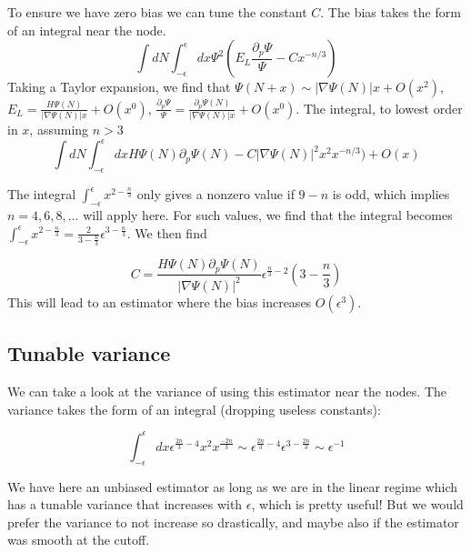 \documentclass{article}
\begin{document}
To ensure we have zero bias we can tune the constant $C$. The bias takes the form of an integral near the node.
$$\int dN \int_{-\epsilon}^{\epsilon} dx \Psi^2 (E_L \frac{\partial_p \Psi}{\Psi} - C x^{-n/3})$$
Taking a Taylor expansion, we find that $\Psi(N+x) \sim |\nabla\Psi(N)|x + O(x^2)$, $E_L = \frac{H\Psi(N)}{|\nabla \Psi(N)|x} + O(x^0)$,
$\frac{\partial_p\Psi}{\Psi} = \frac{\partial_p \Psi(N)}{|\nabla \Psi(N)|x} + O(x^0)$.
The integral, to lowest order in $x$, assuming $n > 3$
$$\int dN \int_{-\epsilon}^{\epsilon} dx H\Psi(N) \partial_p \Psi(N) - C|\nabla \Psi(N)|^2 x^2 x^{-n/3}) + O(x)$$

The integral $\int_{-\epsilon}^{\epsilon} x^{2 - \frac{n}{3}}$ only gives a nonzero value if $9 - n$ is odd, which implies $n = 4, 6, 8, ...$ will apply here.
For such values, we find that the integral becomes $\int_{-\epsilon}^{\epsilon} x^{2 - \frac{n}{3}} = \frac{2}{3 - \frac{n}{3}} \epsilon ^{3 - \frac{n}{3}}$. We then find 

\begin{equation}
C = \frac{H\Psi(N) \partial_p\Psi(N)}{|\nabla \Psi(N)|^2}\epsilon^{\frac{n}{3} - 2}(3 - \frac{n}{3})
\end{equation}
This will lead to an estimator where the bias increases $O(\epsilon^3)$. 

\subsection{Tunable variance}
We can take a look at the variance of using this estimator near the nodes.
The variance takes the form of an integral (dropping useless constants): 

\begin{equation}
\int_{-\epsilon}^{\epsilon} dx \epsilon^{\frac{2n}{3} - 4}x^2 x^\frac{-2n}{3}  \sim \epsilon^{\frac{2n}{3} - 4} \epsilon^{3 - \frac{2n}{3}} \sim \epsilon^{-1}
\end{equation} 

We have here an unbiased estimator as long as we are in the linear regime which has a tunable variance that increases with $\epsilon$, which is pretty useful! But we would prefer the variance to not increase so drastically, and maybe also if the estimator was smooth at the cutoff.
\end{document}
